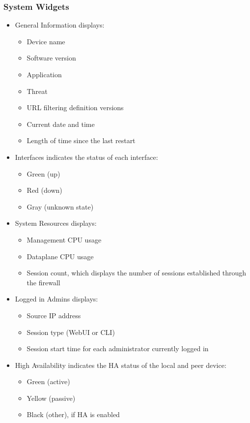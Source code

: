 \subsubsection{System Widgets}
\begin{itemize}
    \item General Information displays:
        \begin{itemize}
            \item Device name
            \item Software version
            \item Application
            \item Threat
            \item URL filtering definition versions
            \item Current date and time
            \item Length of time since the last restart
        \end{itemize}
    \item Interfaces indicates the status of each interface:
        \begin{itemize}
            \item Green (up)
            \item Red (down)
            \item Gray (unknown state)
        \end{itemize}
    \item System Resources displays:
        \begin{itemize}
            \item Management CPU usage
            \item Dataplane CPU usage
            \item Session count, which displays the number of sessions established through the firewall
        \end{itemize}
    \item Logged in Admins displays:
        \begin{itemize}
            \item Source IP address
            \item Session type (WebUI or CLI)
            \item Session start time for each administrator currently logged in
        \end{itemize}
    \item High Availability indicates the HA status of the local and peer device:
        \begin{itemize}
            \item Green (active)
            \item Yellow (passive)
            \item Black (other), if HA is enabled
        \end{itemize}
\end{itemize}

